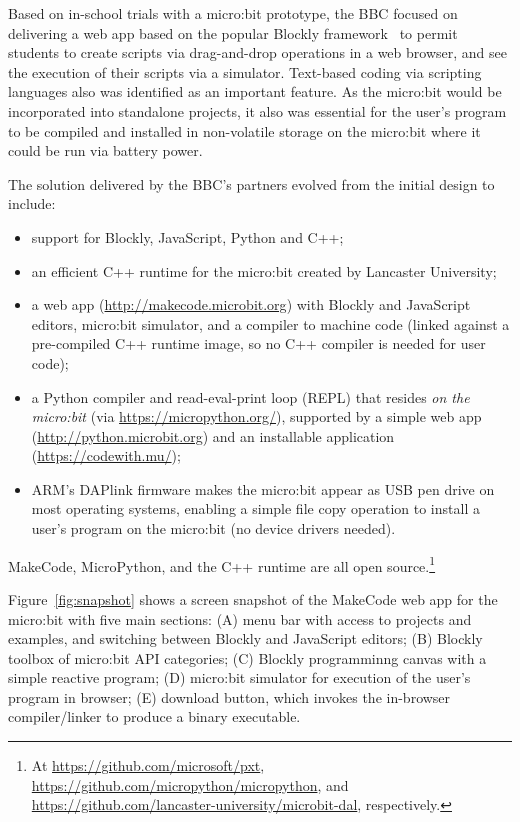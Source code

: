 Based on in-school trials with a micro:bit prototype, the BBC focused on delivering a web app 
based on the popular Blockly framework~\cite{Blocky2015} to permit students to
create scripts via drag-and-drop operations in a web browser, and see
the execution of their scripts via a simulator.
Text-based coding via scripting languages also 
was identified as an important feature. As the micro:bit would be incorporated 
into standalone projects, it also was essential for the user's program to be 
compiled and installed in non-volatile storage on the micro:bit where it 
could be run via battery power.



The solution delivered by the BBC's partners evolved from the initial
design to include:
\begin{itemize}
\item support for Blockly, JavaScript, Python and C++;
\item an efficient C++ runtime for the micro:bit created by Lancaster
University;
\item a web app (\url{http://makecode.microbit.org})
with Blockly and JavaScript editors, micro:bit simulator, 
and a compiler to machine code (linked against a pre-compiled 
C++ runtime image, so no C++ compiler is needed for user code);
\item a Python compiler and read-eval-print loop (REPL) that resides
{\em on the micro:bit} (via \url{https://micropython.org/}), 
supported by a simple web app (\url{http://python.microbit.org}) and 
an installable application (\url{https://codewith.mu/});
\item ARM's DAPlink firmware makes the micro:bit appear as USB pen drive 
on most operating systems, enabling a simple file copy operation to 
install a user's program on the micro:bit (no device drivers needed).
\end{itemize}
MakeCode, MicroPython, and the C++ runtime are all open source.\footnote{
At \url{https://github.com/microsoft/pxt},
\url{https://github.com/micropython/micropython},
and \url{https://github.com/lancaster-university/microbit-dal}, 
respectively.}

Figure~\ref{fig:snapshot} shows a screen snapshot of the MakeCode web app
for the micro:bit with five main sections: (A) menu bar with access to projects
and examples, and switching between Blockly and JavaScript editors; (B)
Blockly toolbox of micro:bit API categories; (C) Blockly programminng
canvas with a simple reactive program; (D) micro:bit simulator for execution
of the user's program in browser; (E) download button, which invokes the in-browser
compiler/linker to produce a binary executable. 

